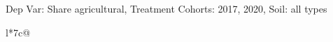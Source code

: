 \begin{table}[H]
\captionlistentry[table]{}
\label{table:beaver_land_class_DVis_land_class_1_SCg23_SSall_soil}
\scriptsize %
Dep Var: Share agricultural, Treatment Cohorts: 2017, 2020, Soil: all types \\
\begin{threeparttable}
\begin{tabulary}{\textwidth}{l*{7}{c}@{}}
\toprule \toprule
\noalign{\smallskip}
\noalign{\smallskip}
\midrule \bottomrule
\end{tabulary}
\medskip
\end{threeparttable}
\end{table}
